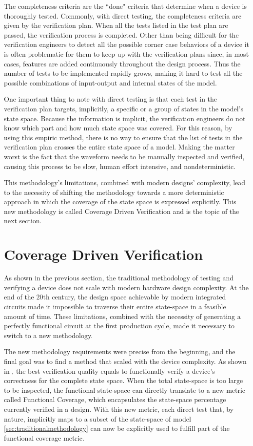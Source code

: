 The completeness criteria are the ``done" criteria that determine when a device
is thoroughly tested. Commonly, with direct testing, the completeness criteria
are given by the verification plan. When all the tests listed in the test plan
are passed, the verification process is completed. Other than being difficult
for the verification engineers to detect all the possible corner case behaviors
of a device it is often problematic for them to keep up with the verification
plans since, in most cases, features are added continuously throughout the
design process. Thus the number of tests to be implemented rapidly grows, making
it hard to test all the possible combinations of input-output and internal
states of the model.

One important thing to note with direct testing is that each test in the
verification plan targets, implicitly, a specific or a group of states in the
model's state space. Because the information is implicit, the verification
engineers do not know which part and how much state space was covered. For this
reason, by using this empiric method, there is no way to ensure that the list of
tests in the verification plan crosses the entire state space of a model. Making
the matter worst is the fact that the waveform needs to be manually inspected
and verified, causing this process to be slow, human effort intensive, and
nondeterministic.

This methodology's limitations, combined with modern designs' complexity, lead
to the necessity of shifting the methodology towards a more deterministic
approach in which the coverage of the state space is expressed explicitly. This
new methodology is called Coverage Driven Verification and is the topic of the
next section.


\section{Coverage Driven Verification}\label{sec:covdrivenv}
As shown in the previous section, the traditional methodology of testing and
verifying a device does not scale with modern hardware design complexity. At the
end of the 20th century, the design space achievable by modern integrated
circuits made it impossible to traverse their entire state-space in a feasible
amount of time. These limitations, combined with the necessity of generating a
perfectly functional circuit at the first production cycle, made it necessary to
switch to a new methodology.

The new methodology requirements were precise from the beginning, and the final
goal was to find a method that scaled with the device complexity. As shown in
\cite{meyer2003principles}, the best verification quality equals to functionally
verify a device's correctness for the complete state space. When the total
state-space is too large to be inspected, the functional state-space can
directly translate to a new metric called Functional Coverage, which
encapsulates the state-space percentage currently verified in a design. With
this new metric, each direct test that, by nature, implicitly maps to a subset
of the state-space of model \ref{sec:traditionalmethodology} can now be
explicitly used to fulfill part of the functional coverage metric.

